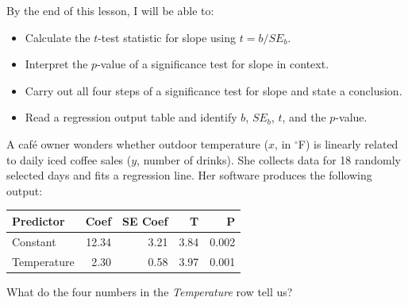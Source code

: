 \documentclass[10pt]{article}
\begin{document}
\namedateperiod

\begin{objectivebox}
By the end of this lesson, I will be able to:
\begin{itemize}
    \item[$\square$] Calculate the $t$-test statistic for slope using $t = b / SE_b$.
    \item[$\square$] Interpret the $p$-value of a significance test for slope in context.
    \item[$\square$] Carry out all four steps of a significance test for slope and state a conclusion.
    \item[$\square$] Read a regression output table and identify $b$, $SE_b$, $t$, and the $p$-value.
\end{itemize}
\end{objectivebox}

\begin{vocabbox}
\end{vocabbox}

\begin{hookbox}
A café owner wonders whether outdoor temperature ($x$, in ${}^\circ$F) is linearly
related to daily iced coffee sales ($y$, number of drinks). She collects data for 18
randomly selected days and fits a regression line. Her software produces the following
output:

\begin{center}
\renewcommand{\arraystretch}{1.4}
\begin{tabular}{lrrrr}
    \textbf{Predictor} & \textbf{Coef} & \textbf{SE Coef} & \textbf{T} & \textbf{P} \\
    \hline
    Constant    & 12.34 & 3.21 & 3.84 & 0.002 \\
    Temperature &  2.30 & 0.58 & 3.97 & 0.001 \\
\end{tabular}
\end{center}

What do the four numbers in the \textit{Temperature} row tell us?

\end{hookbox}
\end{document}

